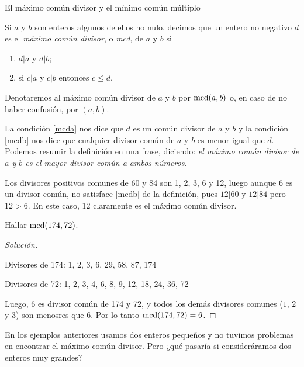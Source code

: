 \begin{section}{El máximo común divisor y el mínimo común múltiplo}\label{seccion-maximo-comun-divisor-mcm}

\begin{definicion}\label{mcd} Si $a$ y $b$ son enteros algunos de ellos no nulo, decimos que un entero no negativo $d$ es el \textit{máximo común divisor}, o \textit{mcd}, de $a$ y $b$ si
\begin{enumerate}[label=\textit{\alph*)}]
\item\label{mcda} $ d|a$  y $d|b$;
\item\label{mcdb}  si $ c|a $ y $c|b$ entonces $ c \le d$.
\end{enumerate}
Denotaremos al máximo común divisor  de $a$ y $b$ por $\operatorname{mcd}(a,b)$ o, en caso de no haber confusión, por $(a,b)$.
\end{definicion}
 

La condición \ref{mcda} nos dice que $d$ es un común divisor de $a$ y $b$ y la condición \ref{mcdb} nos dice que cualquier divisor común de
$a$ y $b$ es menor igual que $d$. Podemos resumir la definición en una frase, diciendo: \textit{el máximo común divisor de $a$ y $b$  es el mayor divisor común a ambos números.} 

\begin{ejemplo*} \label{ejem-1-mcd}
    Los divisores positivos comunes de 60  y 84 son 1, 2, 3, 6 y 12, luego aunque 6  es un divisor común, no satisface \ref{mcdb} de la definición, pues $12|60$ y $12|84$ pero $12>6$. En este caso, 12  claramente es  el  máximo común divisor.
\end{ejemplo*}

\begin{ejemplo*} Hallar   $\operatorname{mcd}(174,72)$.
    \begin{proof}[Solución] ${^{}}$
        
        Divisores de 174: 1, 2, 3, 6, 29, 58, 87, 174
        
        Divisores de 72: 1, 2, 3, 4, 6, 8, 9, 12, 18, 24, 36, 72 
        
        Luego, $6$ es divisor común de 174 y 72, y todos los demás divisores comunes ($1$, $2$ y $3$) son menosres que  $6$. Por lo tanto $\operatorname{mcd}(174,72) =6$.
    \end{proof}
\end{ejemplo*}

En los  ejemplos anteriores usamos dos enteros pequeños y no tuvimos problemas en encontrar el  máximo común divisor. Pero ¿qué pasaría si consideráramos dos enteros muy grandes? 


\end{section}
